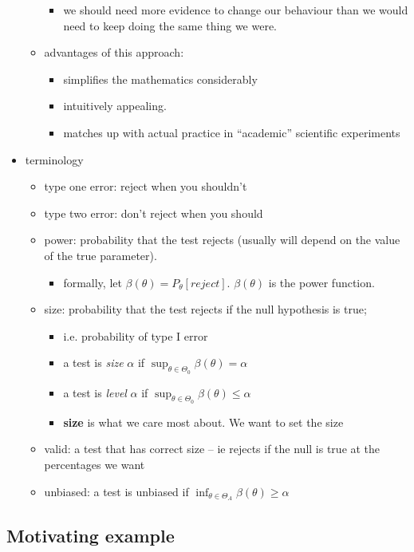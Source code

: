 \begin{itemize}
\begin{itemize}
\begin{itemize}
\item we should need more evidence to change our behaviour than we
           would need to keep doing the same thing we were.
\end{itemize}
\item advantages of this approach:
\begin{itemize}
\item simplifies the mathematics considerably
\item intuitively appealing.
\item matches up with actual practice in ``academic'' scientific experiments
\end{itemize}
\end{itemize}
\item terminology
\begin{itemize}
\item type one error: reject when you shouldn't
\item type two error: don't reject when you should
\item power: probability that the test rejects (usually will depend
         on the value of the true parameter).
\begin{itemize}
\item formally, let $\beta(\theta) = P_\theta[reject]$.  $\beta(\theta)$ is the power function.
\end{itemize}
\item size: probability that the test rejects if the null hypothesis is true;
\begin{itemize}
\item i.e. probability of type I error
\item a test is \emph{size} $\alpha$ if $\sup_{\theta \in \Theta_0} \beta(\theta) = \alpha$
\item a test is \emph{level} $\alpha$ if $\sup_{\theta \in \Theta_0} \beta(\theta) \leq \alpha$
\item \textbf{size} is what we care most about.  We want to set the size
\end{itemize}
\item valid: a test that has correct size -- ie rejects if the null
         is true at the percentages we want
\item unbiased: a test is unbiased if $\inf_{\theta \in \Theta_A} \beta(\theta) \geq \alpha$
\end{itemize}
\end{itemize}
\subsection{Motivating example}
\label{sec-2-4}


